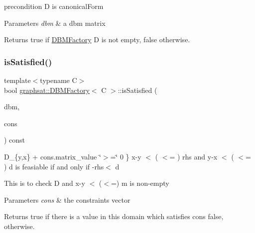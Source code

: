precondition D is canonical\+Form 
\begin{DoxyParams}{Parameters}
{\em dbm} & a dbm matrix\\
\hline
\end{DoxyParams}
\begin{DoxyReturn}{Returns}
true if \mbox{\hyperlink{classgraphsat_1_1_d_b_m_factory}{D\+B\+M\+Factory}} D is not empty, false otherwise. 
\end{DoxyReturn}
\mbox{\label{classgraphsat_1_1_d_b_m_factory_a764bf33011ec3346db15f065d1c66950}} 
\subsubsection{\texorpdfstring{isSatisfied()}{isSatisfied()}}
{\footnotesize\ttfamily template$<$typename C$>$ \\
bool \mbox{\hyperlink{classgraphsat_1_1_d_b_m_factory}{graphsat\+::\+D\+B\+M\+Factory}}$<$ C $>$\+::is\+Satisfied (\begin{DoxyParamCaption}\item[{const C $\ast$const}]{dbm,  }\item[{const \mbox{\hyperlink{classgraphsat_1_1_clock_constraint}{Clock\+Constraint}}$<$ C $>$ \&}]{cons }\end{DoxyParamCaption}) const\hspace{0.3cm}{\ttfamily [inline]}}

D\+\_\+\{y,x\} + cons.\+matrix\+\_\+value \char`\"{}$>$=\char`\"{} 0 \} x-\/y $<$ ( $<$= ) rhs and y-\/x $<$ ( $<$= ) d is feasiable if and only if -\/rhs$<$ d

This is to check D and x-\/y $<$ ($<$=) m is non-\/empty 
\begin{DoxyParams}{Parameters}
{\em cons} & the constraints vector\\
\hline
\end{DoxyParams}
\begin{DoxyReturn}{Returns}
true if there is a value in this domain which satisfies cons false, otherwise. 
\end{DoxyReturn}
\mbox{\label{classgraphsat_1_1_d_b_m_factory_ae8d0c336111c80f14e8ee92afd30589e}} 

